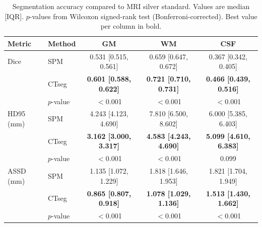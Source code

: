 \begin{table}[t]
\centering
\caption{Segmentation accuracy compared to MRI silver standard. Values are median [IQR]. $p$-values from Wilcoxon signed-rank test (Bonferroni-corrected). Best value per column in bold.}
\label{tab:segmentation}
\small
\begin{tabular}{llccc}
\toprule
Metric & Method & GM & WM & CSF \\
\midrule
Dice & SPM & 0.531 [0.515, 0.561] & 0.659 [0.647, 0.672] & 0.367 [0.342, 0.405] \\
 & CTseg & \textbf{0.601 [0.588, 0.622]} & \textbf{0.721 [0.710, 0.731]} & \textbf{0.466 [0.439, 0.516]} \\
 & $p$-value & $<$0.001 & $<$0.001 & $<$0.001 \\
\midrule
HD95 (mm) & SPM & 4.243 [4.123, 4.690] & 7.810 [6.500, 8.602] & 6.000 [5.385, 6.403] \\
 & CTseg & \textbf{3.162 [3.000, 3.317]} & \textbf{4.583 [4.243, 4.690]} & \textbf{5.099 [4.610, 6.383]} \\
 & $p$-value & $<$0.001 & $<$0.001 & 0.099 \\
\midrule
ASSD (mm) & SPM & 1.135 [1.072, 1.229] & 1.818 [1.646, 1.953] & 1.821 [1.704, 1.949] \\
 & CTseg & \textbf{0.865 [0.807, 0.918]} & \textbf{1.078 [1.029, 1.136]} & \textbf{1.513 [1.430, 1.662]} \\
 & $p$-value & $<$0.001 & $<$0.001 & $<$0.001 \\
\bottomrule
\end{tabular}
\end{table}
